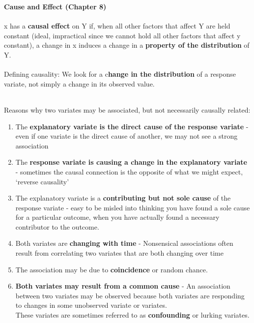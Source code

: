 \documentclass[a4paper,12pt]{article}
\begin{document}
\newpage
\textbf{Cause and Effect (Chapter 8)}
\\
\\ x has a \textbf{causal effect} on Y if, when all other
factors that affect Y are held constant (ideal, impractical since we cannot hold all
other factors that affect y constant), a change in x induces a
change in a \textbf{property of the distribution} of Y.
\\ 
\\Defining causality: We look for a c\textbf{hange in the distribution} of
a response variate, not simply a change in its observed value.
\\
\\{Reasons why two variates may be associated, but not necessarily causally related:
\begin{enumerate}
    \item The \textbf{explanatory variate is the direct cause of the response variate} - even if one variate is the direct cause of another, we may not
see a strong association
    \item The \textbf{response variate is causing a change in the explanatory variate }- sometimes the causal
connection is the opposite of
what we might expect, ‘reverse causality'
    \item The explanatory variate is a \textbf{contributing but not sole cause} of the response variate - easy to be misled into thinking you have found a
sole cause for a particular outcome, when you have actually found
a necessary contributor to the outcome.
    \item Both variates are \textbf{changing with time} - Nonsensical associations often result from correlating two variates
that are both changing over time
    \item The association may be due to \textbf{coincidence} or random chance.
    \item \textbf{Both variates may result from a common cause} - An association between two variates
may be observed because both
variates are responding to changes in
some unobserved variate or variates.
\\These variates are sometimes referred to as \textbf{confounding} or lurking
variates.
\end{enumerate}

}
\end{document}
